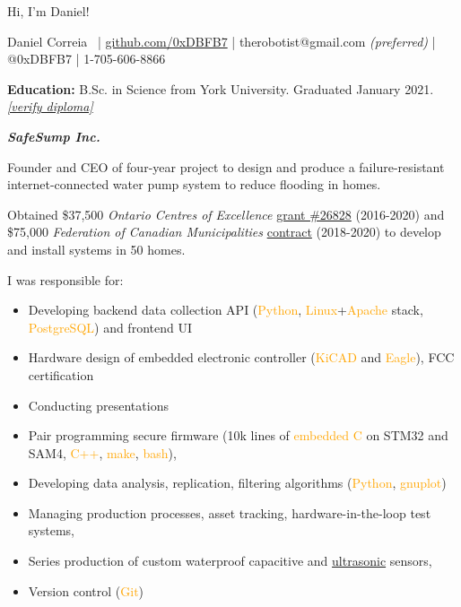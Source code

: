 \documentclass[fleqn,11pt]{article}
\newcommand{\ressection}[1]{\textbf{{\Large \textit{#1}}}\xrfill[0.1ex]{0.6pt}}
\newcommand{\sk}[1]{\textcolor{orange}{#1}}
\newcommand{\itemoptions}{\setlength{\itemindent}{-10pt} \setlength\itemsep{-1em}}
\begin{document}



\begingroup
{}\selectfont

{\Huge Hi, I'm Daniel!}

\endgroup


\begin{center}
\small{{Daniel Correia}\  | \href{https://github.com/0xDBFB7}{github.com/0xDBFB7} | therobotist@gmail.com \textit{(preferred)} | @0xDBFB7 | 1-705-606-8866}\\
\light{\makebox[\linewidth]{\rule{\textwidth}{0.4pt}}}
\end{center}


\begin{tcolorbox}
\textbf{Education:} B.Sc. in Science from York University. Graduated January 2021. \href{https://learner.mycreds.ca/#/sharelink/b664abe7-53a7-4d64-a0f1-bef16337edd0/57724eeb-34ab-4b79-b2a6-cd6bc311039e}{\textit{[verify diploma]}}
\end{tcolorbox}


\ressection{SafeSump Inc.}

Founder and CEO of four-year project to design and produce a failure-resistant internet-connected water pump system to reduce flooding in homes.

Obtained \$37,500 \textit{Ontario Centres of Excellence} \href{https://drive.google.com/file/d/1WXrxVwTggaL7WEvLv6DgJ891fSo7LqqP/view?usp=sharing}{grant \#26828} (2016-2020) and \$75,000 \textit{Federation of Canadian Municipalities} \href{https://drive.google.com/file/d/11pdJNzYDE-28X3m0rH8mE4cxoliTJZGH/view?usp=sharing}{contract} (2018-2020) to develop and install systems in 50 homes.

I was responsible for:
\begin{itemize}\itemoptions
\item Developing backend data collection API (\sk{Python}, \sk{Linux}+\sk{Apache} stack, \sk{PostgreSQL}) and frontend UI
\item Hardware design of embedded electronic controller (\sk{KiCAD} and \sk{Eagle}), FCC certification
\item  Conducting presentations
\item Pair programming secure firmware (10k lines of \sk{embedded C} on STM32 and SAM4, \sk{C++}, \sk{make}, \sk{bash}), 
\item Developing data analysis, replication, filtering algorithms (\sk{Python}, \sk{gnuplot})
\item Managing production processes, asset tracking, hardware-in-the-loop test systems, 
\item Series production of custom waterproof capacitive and \href{https://github.com/0xDBFB7/UltimateUltrasonicAmplifier}{ultrasonic} sensors,
\item Version control (\sk{Git})
\end{itemize}
\end{document}
